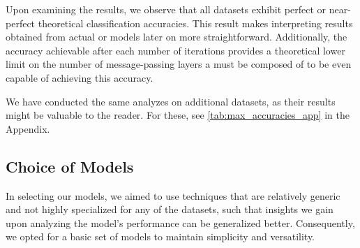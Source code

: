 \begin{table}[H]
	\caption{An overview of the maximum theoretical classification accuracy achievable for each dataset based on the number of \wl iterations in percent. A hyphen ``-'' indicates that the maximum accuracy has converged with fewer iterations, implying that further iterations do not improve the accuracy.}
	\label{tab:max_accuracies}
\end{table}

Upon examining the results, we observe that all datasets exhibit perfect or near-perfect theoretical classification accuracies. This result makes interpreting results obtained from actual \wlnn or \gnn models later on more straightforward. Additionally, the accuracy achievable after each number of iterations provides a theoretical lower limit on the number of message-passing layers a \gnn must be composed of to be even capable of achieving this accuracy. 

We have conducted the same analyzes on additional datasets, as their results might be valuable to the reader. For these, see \cref{tab:max_accuracies_app} in the Appendix.


\subsection{Choice of Models}
In selecting our models, we aimed to use techniques that are relatively generic and not highly specialized for any of the datasets, such that insights we gain upon analyzing the model's performance can be generalized better. Consequently, we opted for a basic set of models to maintain simplicity and versatility.

